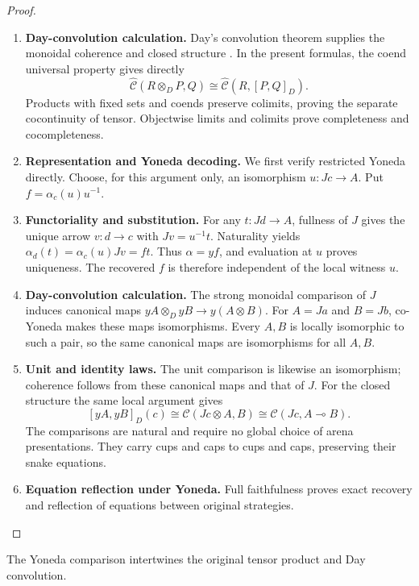 \documentclass[11pt,a4paper]{article}
\numberwithin{equation}{section}
\theoremstyle{definition}
\theoremstyle{remark}
\theoremstyle{plain}
\begin{document}
\begin{proof}
\leavevmode
\begin{enumerate}[label=\textup{(\arabic*)},leftmargin=*,itemsep=4pt,topsep=3pt]
  \item \textbf{Day-convolution calculation.} Day's convolution theorem supplies the monoidal coherence and closed
structure \citep{Day1970ClosedCategories}. In the present formulas, the coend universal property gives directly
\[
 \widehat{\mathcal C}(R\otimes_D P,Q)
 \cong\widehat{\mathcal C}(R,[P,Q]_D).
\]
Products with fixed sets and coends preserve colimits, proving the
separate cocontinuity of tensor. Objectwise limits and colimits prove
completeness and cocompleteness.
  \item \textbf{Representation and Yoneda decoding.} We first verify restricted Yoneda directly. Choose, for this argument only,
an isomorphism $u:Jc\to A$. Put $f=\alpha_c(u)u^{-1}$.
  \item \textbf{Functoriality and substitution.} For any
$t:Jd\to A$, fullness of $J$ gives the unique arrow $v:d\to c$ with
$Jv=u^{-1}t$. Naturality yields
$\alpha_d(t)=\alpha_c(u)Jv=ft$. Thus $\alpha=yf$, and evaluation
at $u$ proves uniqueness. The recovered $f$ is therefore independent
of the local witness $u$.
  \item \textbf{Day-convolution calculation.} The strong monoidal comparison of $J$ induces canonical maps
$yA\otimes_D yB\to y(A\otimes B)$. For $A=Ja$ and $B=Jb$,
co-Yoneda makes these maps isomorphisms. Every $A,B$ is locally
isomorphic to such a pair, so the same canonical maps are isomorphisms
for all $A,B$.
  \item \textbf{Unit and identity laws.} The unit comparison is likewise an isomorphism;
coherence follows from these canonical maps and that of $J$. For the closed structure the same local argument gives
\[
 [yA,yB]_D(c)\cong\mathcal C(Jc\otimes A,B)
                  \cong\mathcal C(Jc,A\multimap B).
\]
The comparisons are natural and require no global choice of arena
presentations. They carry cups and caps to cups and caps, preserving
their snake equations.
  \item \textbf{Equation reflection under Yoneda.} Full faithfulness proves exact recovery and
reflection of equations between original strategies.
\end{enumerate}
\end{proof}

\noindent The Yoneda comparison intertwines the original tensor product and Day convolution.
\begin{center}
\end{center}
\end{document}
